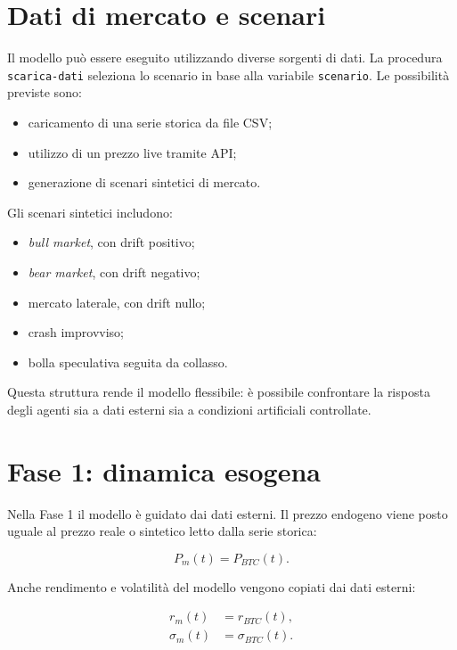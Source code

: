 \section{Dati di mercato e scenari}

Il modello può essere eseguito utilizzando diverse sorgenti di dati. La procedura
\texttt{scarica-dati} seleziona lo scenario in base alla variabile
\texttt{scenario}. Le possibilità previste sono:

\begin{itemize}
    \item caricamento di una serie storica da file CSV;
    \item utilizzo di un prezzo live tramite API;
    \item generazione di scenari sintetici di mercato.
\end{itemize}

Gli scenari sintetici includono:
\begin{itemize}
    \item \textit{bull market}, con drift positivo;
    \item \textit{bear market}, con drift negativo;
    \item mercato laterale, con drift nullo;
    \item crash improvviso;
    \item bolla speculativa seguita da collasso.
\end{itemize}

Questa struttura rende il modello flessibile: è possibile confrontare la risposta
degli agenti sia a dati esterni sia a condizioni artificiali controllate.

\section{Fase 1: dinamica esogena}

Nella Fase 1 il modello è guidato dai dati esterni. Il prezzo endogeno viene
posto uguale al prezzo reale o sintetico letto dalla serie storica:

\begin{equation}
    P_m(t) = P_{BTC}(t).
\end{equation}

Anche rendimento e volatilità del modello vengono copiati dai dati esterni:

\begin{align}
    r_m(t) &= r_{BTC}(t), \\
    \sigma_m(t) &= \sigma_{BTC}(t).
\end{align}

